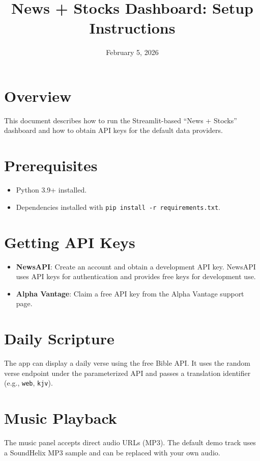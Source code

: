 \documentclass[11pt]{article}
\title{News + Stocks Dashboard: Setup Instructions}
\author{}
\date{February 5, 2026}
\begin{document}
\maketitle

\section*{Overview}
This document describes how to run the Streamlit-based ``News + Stocks'' dashboard and how to obtain API keys for the default data providers.

\section*{Prerequisites}
\begin{itemize}
  \item Python 3.9+ installed.
  \item Dependencies installed with \texttt{pip install -r requirements.txt}.
\end{itemize}

\section*{Getting API Keys}
\begin{itemize}
  \item \textbf{NewsAPI}: Create an account and obtain a development API key. NewsAPI uses API keys for authentication and provides free keys for development use.\cite{newsapi-auth}
  \item \textbf{Alpha Vantage}: Claim a free API key from the Alpha Vantage support page.\cite{alphavantage-support}
\end{itemize}

\section*{Daily Scripture}
The app can display a daily verse using the free Bible API. It uses the random verse endpoint under the parameterized API and passes a translation identifier (e.g., \texttt{web}, \texttt{kjv}).\cite{bible-api}

\section*{Music Playback}
The music panel accepts direct audio URLs (MP3). The default demo track uses a SoundHelix MP3 sample and can be replaced with your own audio.\cite{soundhelix-audio}
\end{document}
